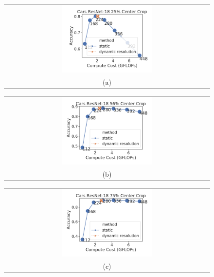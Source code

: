 \begin{figure}[h!]
    \centering
    \begin{tabular}{@{}c@{}}
    \includegraphics[width=0.45\textwidth]{e2e_figures/cars_resnet18_25_center.pdf} \\
    \small (a)
    \end{tabular}
    \begin{tabular}{@{}c@{}}
    \includegraphics[width=0.45\textwidth]{e2e_figures/cars_resnet18_56_center.pdf} \\
    \small (b)
    \end{tabular}
    \begin{tabular}{@{}c@{}}
    \includegraphics[width=0.45\textwidth]{e2e_figures/cars_resnet18_default_center.pdf} \\
    \small (c)
    \end{tabular}
    \begin{tabular}{@{}c@{}}

\end{tabular}
\end{figure}
